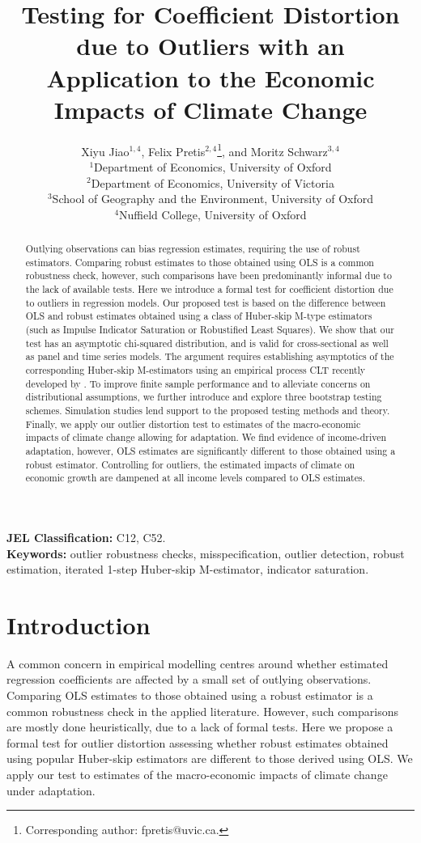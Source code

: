 \documentclass[11pt, letterpaper]{article}
\title{\textbf{Testing for Coefficient Distortion due to Outliers with an Application to the Economic Impacts of Climate Change}}
\author{Xiyu Jiao$^{1, 4}$, Felix Pretis$^{2, 4}$\thanks{Corresponding author: fpretis@uvic.ca.}, and Moritz Schwarz$^{3, 4}$
\vspace{0.5cm} \\
{\small $^1$Department of Economics, University of Oxford} \\
{\small $^2$Department of Economics, University of Victoria} \\
{\small $^3$School of Geography and the Environment, University of Oxford} \\
{\small $^4$Nuffield College, University of Oxford} \\
\vspace{-1cm}
}
\date{}
\numberwithin{algorithm}{section}
\numberwithin{assumption}{section}
\numberwithin{lemma}{section}
\numberwithin{theorem}{section}
\numberwithin{corollary}{section}
\numberwithin{remark}{section}
\numberwithin{equation}{section}
\numberwithin{figure}{section}
\numberwithin{table}{section}
\begin{document}
\maketitle

\begin{abstract}
Outlying observations can bias regression estimates, requiring the use of robust estimators. Comparing robust estimates to those obtained using OLS is a common robustness check, however, such  comparisons have been predominantly informal due to the lack of available tests. Here we introduce a formal test for coefficient distortion due to outliers in regression models. Our proposed test is based on the difference between OLS and robust estimates obtained using a class of Huber-skip M-type estimators (such as Impulse Indicator Saturation or Robustified Least Squares). We show that our test has an asymptotic chi-squared distribution, and is valid for cross-sectional as well as panel and time series models. The argument requires establishing asymptotics of the corresponding Huber-skip M-estimators using an empirical process CLT recently developed by \cite{berenguer2019analysis}. To improve finite sample performance and to alleviate concerns on distributional assumptions, we further introduce and explore three bootstrap testing schemes. Simulation studies lend support to the proposed testing methods and theory. Finally, we apply our outlier distortion test to estimates of the macro-economic impacts of climate change allowing for adaptation. We find evidence of income-driven adaptation, however, OLS estimates are significantly different to those obtained using a robust estimator. Controlling for outliers, the estimated impacts of climate on economic growth are dampened at all income levels compared to OLS estimates.
\end{abstract}

\noindent \textbf{JEL Classification:} C12, C52. \\
\textbf{Keywords:} outlier robustness checks, misspecification, outlier detection, robust estimation, iterated 1-step Huber-skip M-estimator, indicator saturation.


\newpage
\section{Introduction}
A common concern in empirical modelling centres around whether estimated regression coefficients are affected by a small set of outlying observations. Comparing OLS estimates to those obtained using a robust estimator is a common robustness check in the applied literature. However, such comparisons are mostly done heuristically, due to a lack of formal tests. Here we propose a formal test for outlier distortion assessing whether robust estimates obtained using popular Huber-skip estimators are different to those derived using OLS. We apply our test to estimates of the macro-economic impacts of climate change under adaptation.
\end{document}
